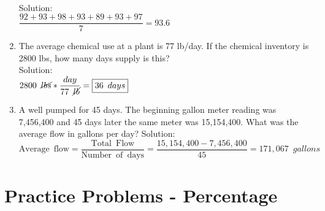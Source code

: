 \begin{enumerate}
\begin{tabular}{|l|l|}
\hline
\end{tabular}\\
\vspace{0.3cm}
Solution:\\
\vspace{0.2cm}
$\dfrac{92+93+98+93+89+93+97}{7}=\boxed{93.6}$
\vspace{0.2cm}
\item The average chemical use at a plant is 77 lb/day. If the chemical inventory is 2800 lbs, how many days supply is this?\\
Solution:\\
$2800 \enspace \cancel{lbs} * \dfrac{day}{77 \enspace \cancel{lb}}=\boxed{36 \enspace days}$\\

\vspace{0.2cm}

\item A well pumped for 45 days. The beginning gallon meter reading was 7,456,400 and 45 days later the same meter was 15,154,400. What was the average flow in gallons per day?
Solution:\\
$ \mathrm{Average \enspace flow} = \dfrac{\mathrm{Total \enspace Flow}}{\mathrm{Number \enspace of \enspace days}}=\dfrac{15,154,400-7,456,400}{45}=\boxed{171,067 \enspace gallons}$

\end{enumerate}

\section*{Practice Problems - Percentage} 


